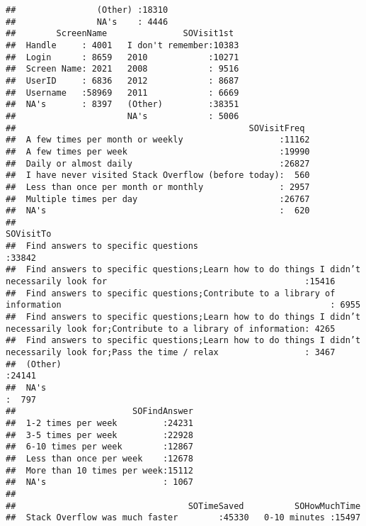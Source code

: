 \documentclass[]{article}
\begin{document}
\begin{verbatim}
##                (Other) :18310                                   
##                NA's    : 4446                                   
##        ScreenName               SOVisit1st   
##  Handle     : 4001   I don't remember:10383  
##  Login      : 8659   2010            :10271  
##  Screen Name: 2021   2008            : 9516  
##  UserID     : 6836   2012            : 8687  
##  Username   :58969   2011            : 6669  
##  NA's       : 8397   (Other)         :38351  
##                      NA's            : 5006  
##                                              SOVisitFreq   
##  A few times per month or weekly                   :11162  
##  A few times per week                              :19990  
##  Daily or almost daily                             :26827  
##  I have never visited Stack Overflow (before today):  560  
##  Less than once per month or monthly               : 2957  
##  Multiple times per day                            :26767  
##  NA's                                              :  620  
##                                                                                                                           SOVisitTo    
##  Find answers to specific questions                                                                                            :33842  
##  Find answers to specific questions;Learn how to do things I didn’t necessarily look for                                       :15416  
##  Find answers to specific questions;Contribute to a library of information                                                     : 6955  
##  Find answers to specific questions;Learn how to do things I didn’t necessarily look for;Contribute to a library of information: 4265  
##  Find answers to specific questions;Learn how to do things I didn’t necessarily look for;Pass the time / relax                 : 3467  
##  (Other)                                                                                                                       :24141  
##  NA's                                                                                                                          :  797  
##                       SOFindAnswer  
##  1-2 times per week         :24231  
##  3-5 times per week         :22928  
##  6-10 times per week        :12867  
##  Less than once per week    :12678  
##  More than 10 times per week:15112  
##  NA's                       : 1067  
##                                     
##                                  SOTimeSaved          SOHowMuchTime  
##  Stack Overflow was much faster        :45330   0-10 minutes :15497  

\end{verbatim}
\end{document}
